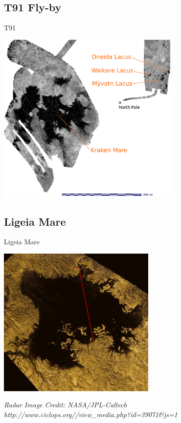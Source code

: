 \documentclass[xcolor=dvipsnames,beamer]{beamer} %
\begin{document}
\subsection{T91 Fly-by}
\begin{frame}[fragile]{T91}

\begin{center}
  \includegraphics[width=9cm]{images/KrakenMareT91_annotated}
\end{center}

\end{frame}
\subsection{Ligeia Mare}
\begin{frame}[fragile]{Ligeia Mare}

\begin{center}
  \includegraphics[width=7.8cm]{images/LigeiaMare}
\end{center}
{\tiny \it Radar Image Credit: NASA/JPL-Caltech\\http://www.ciclops.org//view\_media.php?id=39071\&js=1}
\end{frame}
\end{document}
